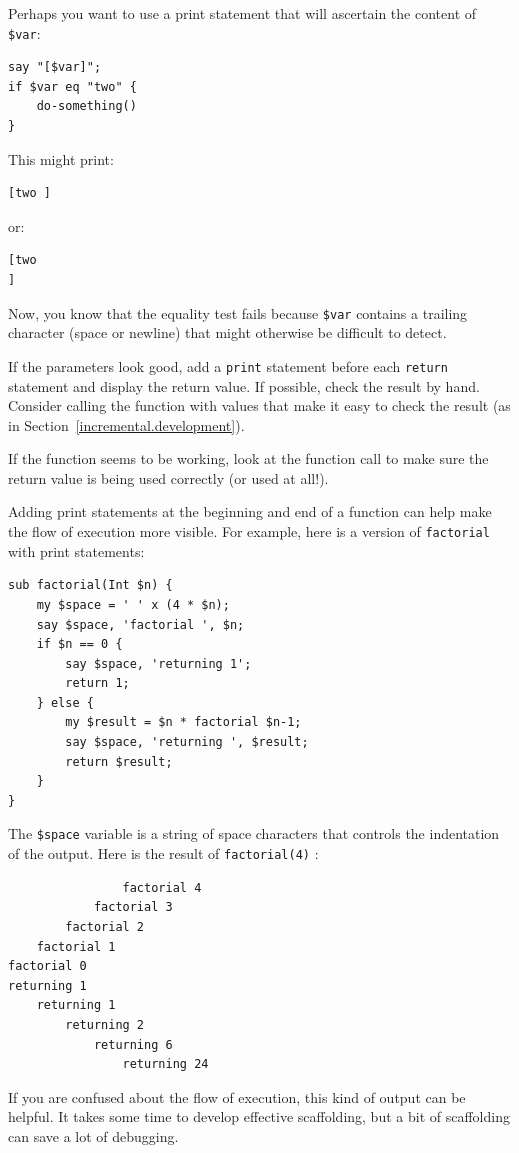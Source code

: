 Perhaps you want to use a print statement that will ascertain 
the content of \verb'$var':
\begin{verbatim}
say "[$var]";
if $var eq "two" {
    do-something()
}
\end{verbatim}
%

This might print:
\begin{verbatim}
[two ]
\end{verbatim}
%

or:
\begin{verbatim}
[two
]
\end{verbatim}
%
Now, you know that the equality test fails because \verb'$var'
contains a trailing character (space or newline) that might otherwise 
be difficult to detect.

If the parameters look good, add a {\tt print} statement before each
{\tt return} statement and display the return value.  If
possible, check the result by hand.  Consider calling the
function with values that make it easy to check the result
(as in Section~\ref{incremental.development}).

If the function seems to be working, look at the function call
to make sure the return value is being used correctly (or used
at all!).

Adding print statements at the beginning and end of a function
can help make the flow of execution more visible.
For example, here is a version of {\tt factorial} with
print statements:

\begin{verbatim}
sub factorial(Int $n) {
    my $space = ' ' x (4 * $n);
    say $space, 'factorial ', $n;
    if $n == 0 {
        say $space, 'returning 1';
        return 1;
    } else {
        my $result = $n * factorial $n-1;
        say $space, 'returning ', $result;
        return $result;
    }
}
\end{verbatim}
%
The {\tt \$space} variable is a string of space characters that controls the
indentation of the output.  Here is the result of {\tt factorial(4)} :

\begin{verbatim}
                factorial 4
            factorial 3
        factorial 2
    factorial 1
factorial 0
returning 1
    returning 1
        returning 2
            returning 6
                returning 24
\end{verbatim}
%
If you are confused about the flow of execution, this kind of
output can be helpful.  It takes some time to develop effective
scaffolding, but a bit of scaffolding can save a lot of debugging.


